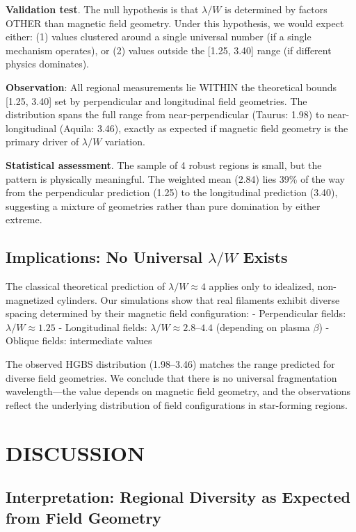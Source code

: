 \documentclass[twoside,twocolumn]{mnras}
\begin{document}
\textbf{Validation test}. The null hypothesis is that $\lambda/W$ is determined by factors OTHER than magnetic field geometry. Under this hypothesis, we would expect either: (1) values clustered around a single universal number (if a single mechanism operates), or (2) values outside the [1.25, 3.40] range (if different physics dominates).

\textbf{Observation}: All regional measurements lie WITHIN the theoretical bounds [1.25, 3.40] set by perpendicular and longitudinal field geometries. The distribution spans the full range from near-perpendicular (Taurus: 1.98) to near-longitudinal (Aquila: 3.46), exactly as expected if magnetic field geometry is the primary driver of $\lambda/W$ variation.

\textbf{Statistical assessment}. The sample of 4 robust regions is small, but the pattern is physically meaningful. The weighted mean (2.84) lies 39\% of the way from the perpendicular prediction (1.25) to the longitudinal prediction (3.40), suggesting a mixture of geometries rather than pure domination by either extreme.

\subsection{Implications: No Universal $\lambda/W$ Exists}

The classical theoretical prediction of $\lambda/W \approx 4$ applies only to idealized, non-magnetized cylinders. Our simulations show that real filaments exhibit diverse spacing determined by their magnetic field configuration:
- Perpendicular fields: $\lambda/W \approx 1.25$
- Longitudinal fields: $\lambda/W \approx 2.8$--$4.4$ (depending on plasma $\beta$)
- Oblique fields: intermediate values

The observed HGBS distribution (1.98--3.46) matches the range predicted for diverse field geometries. We conclude that there is no universal fragmentation wavelength---the value depends on magnetic field geometry, and the observations reflect the underlying distribution of field configurations in star-forming regions.

\section{DISCUSSION}

\subsection{Interpretation: Regional Diversity as Expected from Field Geometry}
\end{document}
